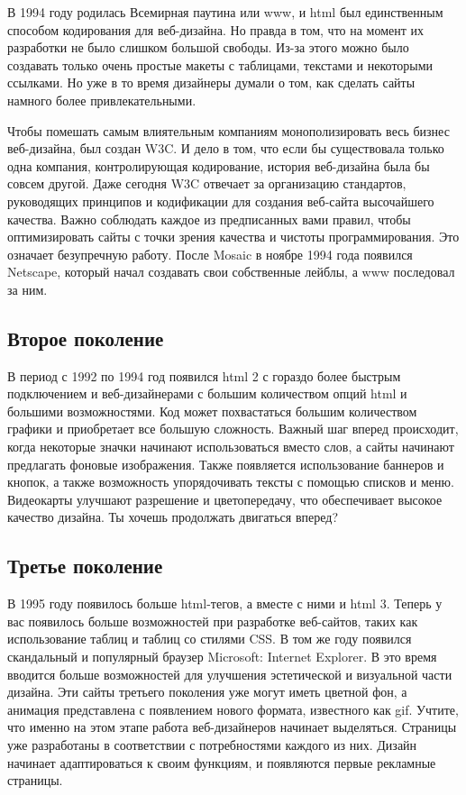 В 1994 году родилась Всемирная паутина или www, и html был единственным способом кодирования для веб-дизайна. Но правда в том, что на момент их разработки не было слишком большой свободы. Из-за этого можно было создавать только очень простые макеты с таблицами, текстами и некоторыми ссылками. Но уже в то время дизайнеры думали о том, как сделать сайты намного более привлекательными.

Чтобы помешать самым влиятельным компаниям монополизировать весь бизнес веб-дизайна, был создан W3C. И дело в том, что если бы существовала только одна компания, контролирующая кодирование, история веб-дизайна была бы совсем другой. Даже сегодня W3C отвечает за организацию стандартов, руководящих принципов и кодификации для создания веб-сайта высочайшего качества. Важно соблюдать каждое из предписанных вами правил, чтобы оптимизировать сайты с точки зрения качества и чистоты программирования. Это означает безупречную работу. После Mosaic в ноябре 1994 года появился Netscape, который начал создавать свои собственные лейблы, а www последовал за ним.

\subsection{Второе поколение}
В период с 1992 по 1994 год появился html 2 с гораздо более быстрым подключением и веб-дизайнерами с большим количеством опций html и большими возможностями. Код может похвастаться большим количеством графики и приобретает все большую сложность. Важный шаг вперед происходит, когда некоторые значки начинают использоваться вместо слов, а сайты начинают предлагать фоновые изображения. Также появляется использование баннеров и кнопок, а также возможность упорядочивать тексты с помощью списков и меню. Видеокарты улучшают разрешение и цветопередачу, что обеспечивает высокое качество дизайна. Ты хочешь продолжать двигаться вперед?

\subsection{Третье поколение}
В 1995 году появилось больше html-тегов, а вместе с ними и html 3. Теперь у вас появилось больше возможностей при разработке веб-сайтов, таких как использование таблиц и таблиц со стилями CSS. В том же году появился скандальный и популярный браузер Microsoft: Internet Explorer. В это время вводится больше возможностей для улучшения эстетической и визуальной части дизайна. Эти сайты третьего поколения уже могут иметь цветной фон, а анимация представлена с появлением нового формата, известного как gif. Учтите, что именно на этом этапе работа веб-дизайнеров начинает выделяться. Страницы уже разработаны в соответствии с потребностями каждого из них. Дизайн начинает адаптироваться к своим функциям, и появляются первые рекламные страницы.

